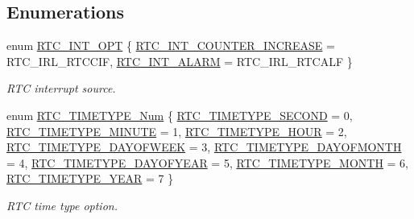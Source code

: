 \subsection*{\-Enumerations}
\begin{DoxyCompactItemize}
\item 
enum \hyperlink{group___r_t_c___public___types_gadc4fcfa14fbbb673619c9da8b56d053c}{\-R\-T\-C\-\_\-\-I\-N\-T\-\_\-\-O\-P\-T} \{ \hyperlink{group___r_t_c___public___types_ggadc4fcfa14fbbb673619c9da8b56d053ca1545f38fd2671cb7521a77e7da3bde4d}{\-R\-T\-C\-\_\-\-I\-N\-T\-\_\-\-C\-O\-U\-N\-T\-E\-R\-\_\-\-I\-N\-C\-R\-E\-A\-S\-E} =  \-R\-T\-C\-\_\-\-I\-R\-L\-\_\-\-R\-T\-C\-C\-I\-F, 
\hyperlink{group___r_t_c___public___types_ggadc4fcfa14fbbb673619c9da8b56d053cadec1af649886bf5a419d636276ca54a5}{\-R\-T\-C\-\_\-\-I\-N\-T\-\_\-\-A\-L\-A\-R\-M} =  \-R\-T\-C\-\_\-\-I\-R\-L\-\_\-\-R\-T\-C\-A\-L\-F
 \}
\begin{DoxyCompactList}\small\item\em \-R\-T\-C interrupt source. \end{DoxyCompactList}\item 
enum \hyperlink{group___r_t_c___public___types_ga0d539cc07c5f18e6f1f66749ea934ecc}{\-R\-T\-C\-\_\-\-T\-I\-M\-E\-T\-Y\-P\-E\-\_\-\-Num} \{ \*
\hyperlink{group___r_t_c___public___types_gga0d539cc07c5f18e6f1f66749ea934eccac0bdc1ff011be37cfeecb77c241e7fb8}{\-R\-T\-C\-\_\-\-T\-I\-M\-E\-T\-Y\-P\-E\-\_\-\-S\-E\-C\-O\-N\-D} =  0, 
\hyperlink{group___r_t_c___public___types_gga0d539cc07c5f18e6f1f66749ea934ecca11974e5996bfe6fbf0381d7ef3836964}{\-R\-T\-C\-\_\-\-T\-I\-M\-E\-T\-Y\-P\-E\-\_\-\-M\-I\-N\-U\-T\-E} =  1, 
\hyperlink{group___r_t_c___public___types_gga0d539cc07c5f18e6f1f66749ea934ecca4e88c263358395fecc19306556addacc}{\-R\-T\-C\-\_\-\-T\-I\-M\-E\-T\-Y\-P\-E\-\_\-\-H\-O\-U\-R} =  2, 
\hyperlink{group___r_t_c___public___types_gga0d539cc07c5f18e6f1f66749ea934ecca88f328753d58927fafd45b35e0815e80}{\-R\-T\-C\-\_\-\-T\-I\-M\-E\-T\-Y\-P\-E\-\_\-\-D\-A\-Y\-O\-F\-W\-E\-E\-K} =  3, 
\*
\hyperlink{group___r_t_c___public___types_gga0d539cc07c5f18e6f1f66749ea934ecca3cc8b55755f86e8a6a1a870a79122324}{\-R\-T\-C\-\_\-\-T\-I\-M\-E\-T\-Y\-P\-E\-\_\-\-D\-A\-Y\-O\-F\-M\-O\-N\-T\-H} =  4, 
\hyperlink{group___r_t_c___public___types_gga0d539cc07c5f18e6f1f66749ea934eccad05ce02297b482d4fa5b6a491ff04aff}{\-R\-T\-C\-\_\-\-T\-I\-M\-E\-T\-Y\-P\-E\-\_\-\-D\-A\-Y\-O\-F\-Y\-E\-A\-R} =  5, 
\hyperlink{group___r_t_c___public___types_gga0d539cc07c5f18e6f1f66749ea934ecca45d2078908fb25a714cbd01766f55fae}{\-R\-T\-C\-\_\-\-T\-I\-M\-E\-T\-Y\-P\-E\-\_\-\-M\-O\-N\-T\-H} =  6, 
\hyperlink{group___r_t_c___public___types_gga0d539cc07c5f18e6f1f66749ea934ecca780e93b1c505ed02ed139894566fcfe0}{\-R\-T\-C\-\_\-\-T\-I\-M\-E\-T\-Y\-P\-E\-\_\-\-Y\-E\-A\-R} =  7
 \}
\begin{DoxyCompactList}\small\item\em \-R\-T\-C time type option. \end{DoxyCompactList}\end{DoxyCompactItemize}


